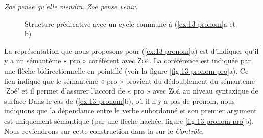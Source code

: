 \ea\label{ex:13-pronom}
\ea \textit{Zoé pense qu’elle viendra}.
\ex \textit{Zoé pense venir}.\z\z

\begin{figure}
\caption{Structure prédicative avec un cycle commune à (\ref{ex:13-pronom}a et b)\label{fig:13-pronom-sem}}
\end{figure}

La représentation que nous proposons pour (\ref{ex:13-pronom}a) est d’indiquer qu’il y a un sémantème « pro » coréférent avec \textsc{Zoé}. La coréférence est indiquée par une flèche bidirectionnelle en pointillé (voir la figure \ref{fig:13-pronom-pro}a). Ce lien indique que le sémantème « pro » provient du dédoublement du sémantème ‘Zoé’ et il permet d’assurer l’accord de « pro » avec \textsc{Zoé} au niveau syntaxique de surface Dans le cas de (\ref{ex:13-pronom}b), où il n’y a pas de pronom, nous indiquons que la dépendance entre le verbe subordonné et son premier argument est uniquement sémantique (par une flèche hachée; figure \ref{fig:13-pronom-pro}b). Nous reviendrons sur cette construction dans la  sur le \textit{Contrôle}.

